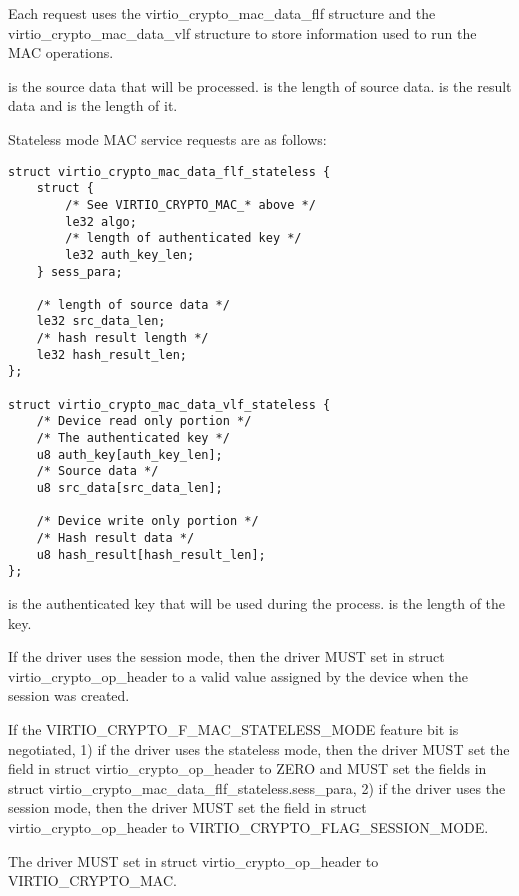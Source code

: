 Each request uses the virtio_crypto_mac_data_flf structure and the
virtio_crypto_mac_data_vlf structure to store information used to run the
MAC operations.

 is the source data that will be processed.
 is the length of source data.
 is the result data and  is the length
of it.

Stateless mode MAC service requests are as follows:

\begin{lstlisting}
struct virtio_crypto_mac_data_flf_stateless {
    struct {
        /* See VIRTIO_CRYPTO_MAC_* above */
        le32 algo;
        /* length of authenticated key */
        le32 auth_key_len;
    } sess_para;

    /* length of source data */
    le32 src_data_len;
    /* hash result length */
    le32 hash_result_len;
};

struct virtio_crypto_mac_data_vlf_stateless {
    /* Device read only portion */
    /* The authenticated key */
    u8 auth_key[auth_key_len];
    /* Source data */
    u8 src_data[src_data_len];

    /* Device write only portion */
    /* Hash result data */
    u8 hash_result[hash_result_len];
};
\end{lstlisting}

 is the authenticated key that will be used during the process.
 is the length of the key.


\begin{itemize*}
\item If the driver uses the session mode, then the driver MUST set 
    in struct virtio_crypto_op_header to a valid value assigned by the device when the
    session was created.
\item If the VIRTIO_CRYPTO_F_MAC_STATELESS_MODE feature bit is negotiated, 1) if the
    driver uses the stateless mode, then the driver MUST set the  field
    in struct virtio_crypto_op_header to ZERO and MUST set the fields in struct
    virtio_crypto_mac_data_flf_stateless.sess_para, 2) if the driver uses the session
    mode, then the driver MUST set the  field in struct virtio_crypto_op_header
    to VIRTIO_CRYPTO_FLAG_SESSION_MODE.
\item The driver MUST set  in struct virtio_crypto_op_header to VIRTIO_CRYPTO_MAC.
\end{itemize*}

